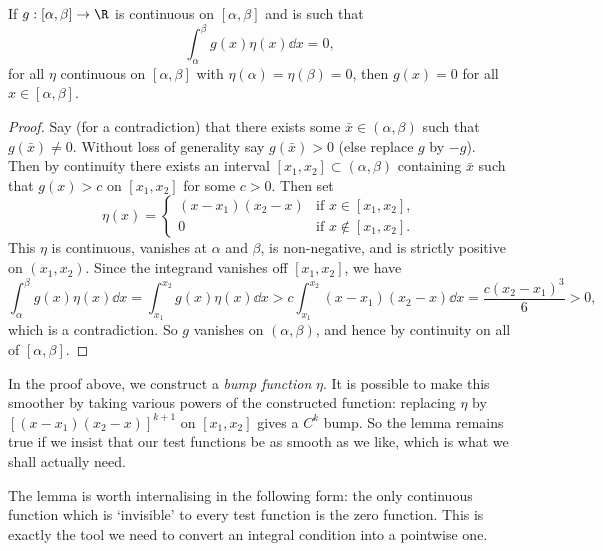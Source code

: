 \documentclass[a4paper]{scrartcl}
\begin{document}
\begin{lemma}\label{lem:fundamental}
	If $g: [\alpha, \beta] \rightarrow \R$ is continuous on $[\alpha, \beta]$ and is such that
	$$
	\int_{\alpha}^{\beta} g(x) \eta(x) \dd x = 0,
	$$
	for all $\eta$ continuous on $[\alpha, \beta]$ with $\eta(\alpha) = \eta(\beta) = 0$, then $g(x) = 0$ for all $x \in [\alpha, \beta]$.
\end{lemma}
\begin{proof}
	Say (for a contradiction) that there exists some $\bar{x} \in (\alpha, \beta)$ such that $g(\bar{x}) \neq 0$. Without loss of generality say $g(\bar{x}) > 0$ (else replace $g$ by $-g$). Then by continuity there exists an interval $[x_1, x_2] \subset (\alpha, \beta)$ containing $\bar{x}$ such that $g(x) > c$ on $[x_1, x_2]$ for some $c > 0$. Then set
	$$
	\eta(x) =
	\begin{cases}
		(x - x_1)(x_2 - x) &\mbox{if } x \in [x_1, x_2], \\
		0 &\mbox{if } x \not \in [x_1, x_2].
	   \end{cases}
	$$
	This $\eta$ is continuous, vanishes at $\alpha$ and $\beta$, is non-negative, and is strictly positive on $(x_1, x_2)$. Since the integrand vanishes off $[x_1, x_2]$, we have
	$$
	   \int_\alpha^\beta g(x) \eta(x) \dd x = \int_{x_1}^{x_2} g(x)\eta(x) \dd x > c \int_{x_1}^{x_2} (x - x_1)(x_2 - x) \dd x = \frac{c(x_2 - x_1)^3}{6} > 0,
	$$
	which is a contradiction. So $g$ vanishes on $(\alpha, \beta)$, and hence by continuity on all of $[\alpha, \beta]$.
\end{proof}

\begin{remark}
	In the proof above, we construct a \emph{bump function} $\eta$. It is possible to make this smoother by taking various powers of the constructed function: replacing $\eta$ by $\left[(x-x_1)(x_2-x)\right]^{k+1}$ on $[x_1, x_2]$ gives a $C^k$ bump. So the lemma remains true if we insist that our test functions be as smooth as we like, which is what we shall actually need.
\end{remark}

The lemma is worth internalising in the following form: the only continuous function which is `invisible' to every test function is the zero function. This is exactly the tool we need to convert an integral condition into a pointwise one.
\end{document}
